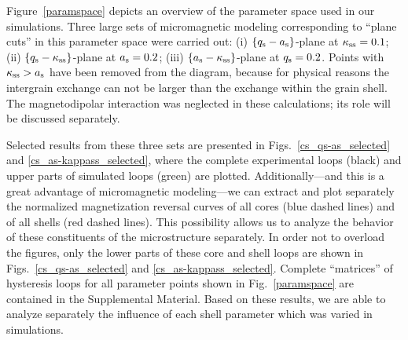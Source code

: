\documentclass[prm,twocolumn,showkeys,preprintnumbers,amsmath,amssymb,superscriptaddress,aps,10pt]{revtex4-1}
\begin{document}
Figure~\ref{paramspace} depicts an overview of the parameter space used in our simulations. Three large sets of micromagnetic modeling corresponding to ``plane cuts'' in this parameter space were carried out: (i) $\{ q_{\rm s} - a_{\rm s} \}$-plane at $\kappa_{\rm ss} = 0.1$; (ii) $\{ q_{\rm s} - \kappa_{\rm ss} \}$-plane at $a_{\rm s} = 0.2$; (iii) $\{ a_{\rm s} - \kappa_{\rm ss} \}$-plane at $q_{\rm s} = 0.2$. Points with $\kappa_{\rm ss} > a_{\rm s}$ have been removed from the diagram, because for physical reasons the intergrain exchange can not be larger than the exchange within the grain shell. The magnetodipolar interaction was neglected in these calculations; its role will be discussed separately.
\begin{figure*}[htb]
\centering
{}
\caption{Parameter space used in the micromagnetic simulations of core-shell-based nanocomposites and quality-of-fit parameter $\Delta$ (shown as color circles) for various shell parameters.}
\label{paramspace}
\end{figure*}
Selected results from these three sets are presented in Figs.~\ref{cs_qs-as_selected} and \ref{cs_as-kappass_selected}, where the complete experimental loops (black) and upper parts of simulated loops (green) are plotted. Additionally---and this is a great advantage of micromagnetic modeling---we can extract and plot separately the normalized magnetization reversal curves of all cores (blue dashed lines) and of all shells (red dashed lines). This possibility allows us to analyze the behavior of these constituents of the microstructure separately. In order not to overload the figures, only the lower parts of these core and shell loops are shown in Figs.~\ref{cs_qs-as_selected} and \ref{cs_as-kappass_selected}. Complete ``matrices'' of hysteresis loops for all parameter points shown in Fig.~\ref{paramspace} are contained in the Supplemental Material. Based on these results, we are able to analyze separately the influence of each shell parameter which was varied in simulations.
\end{document}
